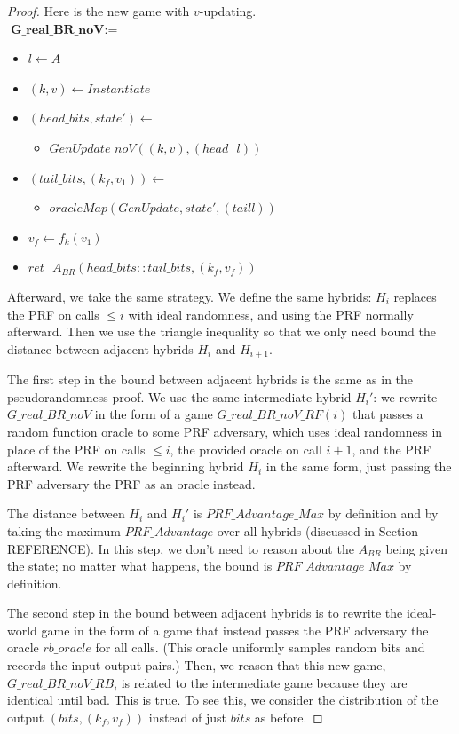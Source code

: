 \documentclass[12pt,lot, lof]{puthesis}
\newenvironment{game}
{ \begin{itemize}[noitemsep,nolistsep] 
}
{ \end{itemize}                  }
\newcommand{\s} {\textrm{ }}
\newcommand{\lar}{\leftarrow}
\begin{document}
{\begin{proof}
Here is the new game with $v$-updating.\\

$\textbf{G\_real\_BR\_noV} := $
\begin{game}
\item[] $l \leftarrow A$
\item[] $(k,v) \leftarrow Instantiate$
\item[] $(head\_bits, state') \lar$
  \begin{game}
    \item[]  $GenUpdate\_noV((k, v), (head \s l))$
  \end{game}
\item[] $(tail\_bits, (k_f, v_1)) \lar$
  \begin{game}
    \item[] $oracleMap(GenUpdate,state',(tail l))$
  \end{game}
\item[] $v_f \lar f_k(v_1)$
\item[] $ret \s A_{BR}(head\_bits :: tail\_bits, (k_f, v_f))$ \\
\end{game}

Afterward, we take the same strategy. We define the same hybrids: $H_i$ replaces the PRF on calls $\leq i$ with ideal randomness, and using the PRF normally afterward. Then we use the triangle inequality so that we only need bound the distance between adjacent hybrids $H_i$ and $H_{i+1}$.

The first step in the bound between adjacent hybrids is the same as in the pseudorandomness proof. We use the same intermediate hybrid $H_i'$: we rewrite $G\_real\_BR\_noV$ in the form of a game $G\_real\_BR\_noV\_RF(i)$ that passes a random function oracle to some PRF adversary, which uses ideal randomness in place of the PRF on calls $\leq i$, the provided oracle on call $i+1$, and the PRF afterward. We rewrite the beginning hybrid $H_i$ in the same form, just passing the PRF adversary the PRF as an oracle instead.

The distance between $H_i$ and $H_i'$ is $PRF\_Advantage\_Max$ by definition and by taking the maximum $PRF\_Advantage$ over all hybrids (discussed in Section REFERENCE). In this step, we don't need to reason about the $A_{BR}$ being given the state; no matter what happens, the bound is $PRF\_Advantage\_Max$ by definition.

The second step in the bound between adjacent hybrids is to rewrite the ideal-world game in the form of a game that instead passes the PRF adversary the oracle $rb\_oracle$ for all calls. (This oracle uniformly samples random bits and records the input-output pairs.) Then, we reason that this new game, $G\_real\_BR\_noV\_RB$, is related to the intermediate game because they are identical until bad. This is true. To see this, we consider the distribution of the output $(bits, (k_f, v_f))$ instead of just $bits$ as before.


\end{proof}}
\end{document}
